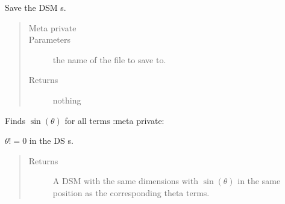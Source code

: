 \documentclass[letterpaper,10pt,english]{sphinxmanual}
\begin{document}
\begin{fulllineitems}

\begin{fulllineitems}
\label{\detokenize{index:DictionarySparseMatrix.DS.save_dict}}
Save the DSM s.
\begin{quote}\begin{description}
\item[{Meta private}] \leavevmode
\item[{Parameters}] \leavevmode
{} \textendash{} the name of the file to save to.

\item[{Returns}] \leavevmode
nothing

\end{description}\end{quote}

\end{fulllineitems}


\begin{fulllineitems}
\label{\detokenize{index:DictionarySparseMatrix.DS.sin}}
Finds \(\sin(\theta)\) for all terms
:meta private:

\(\theta != 0\) in the DS s.
\begin{quote}\begin{description}
\item[{Returns}] \leavevmode
A DSM with the same dimensions with     \(\sin(\theta)\) in the      same position as the corresponding theta terms.

\end{description}\end{quote}

\end{fulllineitems}



\end{fulllineitems}
\end{document}
